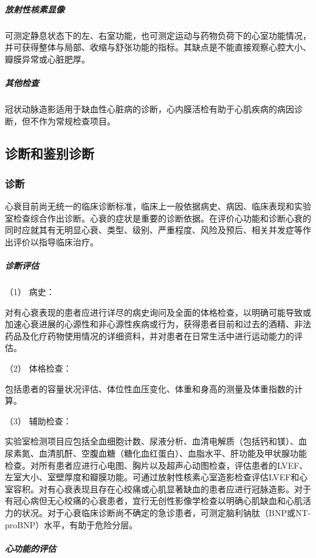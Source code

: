\subparagraph{放射性核素显像}

可测定静息状态下的左、右室功能，也可测定运动与药物负荷下的心室功能情况，并可获得整体与局部、收缩与舒张功能的指标。其缺点是不能直接观察心腔大小、瓣膜异常或心脏肥厚。

\subparagraph{其他检查}

冠状动脉造影适用于缺血性心脏病的诊断，心内膜活检有助于心肌疾病的病因诊断，但不作为常规检查项目。

\subsection{诊断和鉴别诊断}

\subsubsection{诊断}

心衰目前尚无统一的临床诊断标准，临床上一般依据病史、病因、临床表现和实验室检查综合作出诊断。心衰的症状是重要的诊断依据。在评价心功能和诊断心衰的同时应就其有无明显心衰、类型、级别、严重程度、风险及预后、相关并发症等作出评价以指导临床治疗。

\subparagraph{诊断评估}

\hypertarget{text00073.htmlux5cux23CHP3-3-2-4-1-1-1}{}
（1） 病史：

对有心衰表现的患者应进行详尽的病史询问及全面的体格检查，以明确可能导致或加速心衰进展的心源性和非心源性疾病或行为，获得患者目前和过去的酒精、非法药品及化疗药物使用情况的详细资料，并对患者在日常生活中进行运动能力的评估。

\hypertarget{text00073.htmlux5cux23CHP3-3-2-4-1-1-2}{}
（2） 体格检查：

包括患者的容量状况评估、体位性血压变化、体重和身高的测量及体重指数的计算。

\hypertarget{text00073.htmlux5cux23CHP3-3-2-4-1-1-3}{}
（3） 辅助检查：

实验室检测项目应包括全血细胞计数、尿液分析、血清电解质（包括钙和镁）、血尿素氮、血清肌酐、空腹血糖（糖化血红蛋白）、血脂水平、肝功能及甲状腺功能检查。对所有患者应进行心电图、胸片以及超声心动图检查，评估患者的LVEF、左室大小、室壁厚度和瓣膜功能。可通过放射性核素心室造影检查评估LVEF和心室容积。对有心衰表现且存在心绞痛或心肌显著缺血的患者应进行冠脉造影。对于有冠心病但无心绞痛的心衰患者，宜行无创性影像学检查以明确心肌缺血和心肌活力的状况。对于心衰临床诊断尚不确定的急诊患者，可测定脑利钠肽（BNP或NT-proBNP）水平，有助于危险分层。

\subparagraph{心功能的评估}

